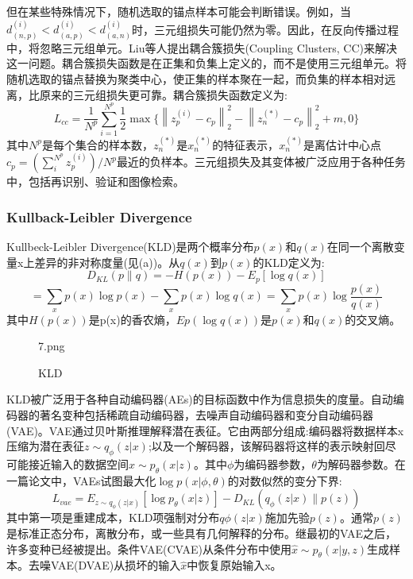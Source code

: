 \documentclass[final]{cvpr}
\begin{document}
但在某些特殊情况下，随机选取的锚点样本可能会判断错误。例如，当$d_{(n,p)}^{(i)}<d_{(a,p)}^{(i)}< d_{(a,n)}^{(i)}$时，三元组损失可能仍然为零。因此，在反向传播过程中，将忽略三元组单元。Liu等人提出耦合簇损失(Coupling Clusters, CC)来解决这一问题。耦合簇损失函数是在正集和负集上定义的，而不是使用三元组单元。将随机选取的锚点替换为聚类中心，使正集的样本聚在一起，而负集的样本相对远离，比原来的三元组损失更可靠。耦合簇损失函数定义为:
\begin{equation}
	L_{cc}=\frac{1}{N^p}\sum_{i=1}^{N^p}\frac{1}{2}\max\{ \left\|z^{(i)}_p-c_p\right\|_2^2
	-\left\|z^{(*)}_n-c_p\right\|_2^2 +m,0\}
\end{equation}
其中$N^p$是每个集合的样本数，$z^{(*)}_n$是$x^{(*)}_n$的特征表示，$x^{(*)}_n$是离估计中心点$c_p=(\sum_i^{N^p}z_p^{(i)})/N^p$最近的负样本。三元组损失及其变体被广泛应用于各种任务中，包括再识别、验证和图像检索。

\subsubsection{Kullback-Leibler Divergence}

Kullbeck-Leibler Divergence(KLD)是两个概率分布$p(x)$和$q(x)$在同一个离散变量x上差异的非对称度量(见(a))。从$q(x)$到$p(x)$的KLD定义为:
\begin{equation}
	D_{KL}(p\|q)=-H(p(x))-E_p[\log q(x)] 
\end{equation}
\begin{equation}
	=\sum_xp(x)\log p(x)-\sum_xp(x)\log q(x)=\sum_xp(x)\log\frac{p(x)}{q(x)}
\end{equation}
其中$H(p(x))$是p(x)的香农熵，$Ep(\log q(x))$是$p(x)$和$q(x)$的交叉熵。

\begin{figure}[t!]
	\begin{overpic}[width=\columnwidth]{7.png}
	\end{overpic}
	\caption{KLD
	}\label{fig:KLD}
\end{figure}

KLD被广泛用于各种自动编码器(AEs)的目标函数中作为信息损失的度量。自动编码器的著名变种包括稀疏自动编码器，去噪声自动编码器和变分自动编码器(VAE)。VAE通过贝叶斯推理解释潜在表征。它由两部分组成:编码器将数据样本x压缩为潜在表征$z \sim q_\phi(z|x)$;以及一个解码器，该解码器将这样的表示映射回尽可能接近输入的数据空间$\hat{x}\sim p_\theta(x|z)$。其中$\phi$为编码器参数，$\theta$为解码器参数。在一篇论文中，VAEs试图最大化$\log p(x|\phi,\theta)$的对数似然的变分下界:
\begin{equation}
	L_{vae}=E_{z\sim q_\phi(z|x)}[\log p_\theta(x|z)]-D_{KL}(q_\phi(z|x)\|p(z))
\end{equation}
其中第一项是重建成本，KLD项强制对分布$q\phi(z|x)$施加先验$p(z)$。通常$p(z)$是标准正态分布，离散分布，或一些具有几何解释的分布。继最初的VAE之后，许多变种已经被提出。条件VAE(CVAE)从条件分布中使用$\hat{x}\sim p_\theta(x|y,z)$生成样本。去噪VAE(DVAE)从损坏的输入$\hat{x}$中恢复原始输入x。
\end{document}
